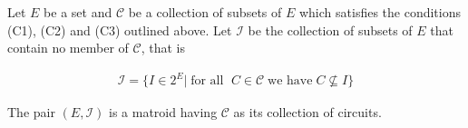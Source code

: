 \begin{theorem}\label{thm:matroid-circuit-definition}
Let $E$ be a set and $\mathcal C$ be a collection of subsets of $E$ which satisfies the conditions (C1), (C2) and (C3) outlined above. Let  $\mathcal I$  be the collection of subsets of $E$ that contain no member of $\mathcal C$, that is 

\begin{align}
   \mathcal{I} = \{I \in 2^E |\; \text{for all } \; C \in \mathcal{C}\; \text{we have} \; C \not\subseteq I\}
    \label{independent-sets-from-circuits}
\end{align}

    The pair $(E,\mathcal I)$ is a matroid having $\mathcal C$ as its collection of circuits.
\end{theorem}

